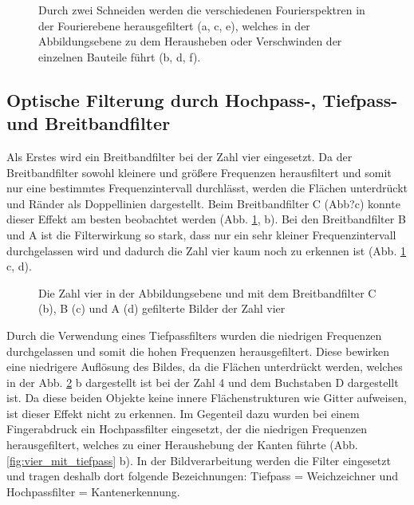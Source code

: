\begin{figure}[h]
	\centering
	\caption[Abbildung Fourierhaus mit Filtern]{
		Durch zwei Schneiden werden die verschiedenen Fourierspektren in der Fourierebene herausgefiltert (a, c, e), welches in der   Abbildungsebene zu dem Herausheben oder Verschwinden der einzelnen Bauteile führt (b, d, f).
	}
	\label{fig:fourierhaus_mit_filtern}
\end{figure}

\subsection{Optische Filterung durch Hochpass-, Tiefpass- und Breitbandfilter}

Als Erstes wird ein Breitbandfilter bei der Zahl vier eingesetzt. Da der Breitbandfilter sowohl kleinere und größere Frequenzen herausfiltert und somit nur eine bestimmtes Frequenzintervall durchlässt, werden die Flächen unterdrückt und Ränder als Doppellinien dargestellt. Beim Breitbandfilter C (Abb?c) konnte dieser Effekt am besten beobachtet werden (Abb. \ref{fig:fourierhaus_mit_filtern}, b). Bei den Breitbandfilter B und A ist die Filterwirkung so stark, dass nur
ein sehr kleiner Frequenzintervall durchgelassen wird und dadurch die Zahl vier kaum noch zu erkennen ist (Abb. \ref{fig:fourierhaus_mit_filtern} c, d).

\begin{figure}[h]
	\centering
	\caption[Zahl 4 mit Breitbandfiltern]{Die Zahl vier in  der Abbildungsebene und mit dem Breitbandfilter C (b), B (c) 
	und A (d) gefilterte Bilder der Zahl vier}
	\label{fig:vier_mit_breitband}
\end{figure}

Durch die Verwendung eines Tiefpassfilters wurden die niedrigen Frequenzen durchgelassen und somit die hohen Frequenzen herausgefiltert. Diese bewirken eine niedrigere Auflösung des
Bildes, da die Flächen unterdrückt werden, welches in der Abb. \ref{fig:vier_mit_breitband} b dargestellt ist bei der Zahl 4 und dem Buchstaben D dargestellt ist. Da diese beiden Objekte keine innere Flächenstrukturen wie Gitter aufweisen, ist dieser Effekt nicht zu erkennen.
Im Gegenteil dazu wurden bei einem Fingerabdruck ein Hochpassfilter eingesetzt, der die niedrigen Frequenzen herausgefiltert, welches zu einer Heraushebung der Kanten führte (Abb. \ref{fig:vier_mit_tiefpass} b). In der Bildverarbeitung werden die Filter eingesetzt und tragen deshalb dort folgende Bezeichnungen: Tiefpass = Weichzeichner und Hochpassfilter = Kantenerkennung.

